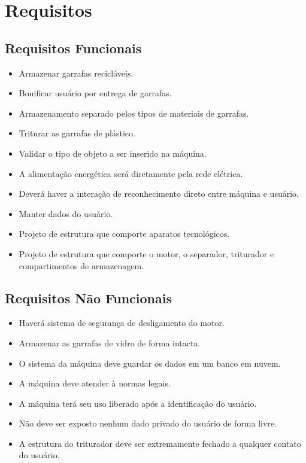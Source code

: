 \section{Requisitos}
\label{sec:requisitos}
\subsection{Requisitos Funcionais}

\begin{itemize}
\item Armazenar garrafas recicláveis.
\item Bonificar usuário por entrega de garrafas.
\item Armazenamento separado pelos tipos de materiais de garrafas.
\item Triturar as garrafas de plástico.
\item Validar o tipo de objeto a ser inserido na máquina.
\item A alimentação energética será diretamente pela rede elétrica.
\item Deverá haver a interação de reconhecimento direto entre máquina e usuário.
\item Manter dados do usuário.
\item Projeto de estrutura que comporte aparatos tecnológicos.
\item Projeto de estrutura que comporte o motor, o separador, triturador e compartimentos de armazenagem.

\end{itemize}

\subsection{Requisitos Não Funcionais}

\begin{itemize}
\item Haverá sistema de segurança de desligamento do motor.
\item Armazenar as garrafas de vidro de forma intacta.
\item O sistema da máquina deve guardar os dados em um banco em nuvem.
\item A máquina deve atender à normas legais.
\item A máquina terá seu uso liberado após a identificação do usuário.
\item Não deve ser exposto nenhum dado privado do usuário de forma livre.
\item A estrutura do triturador deve ser extremamente fechado a qualquer contato do usuário. 

\end{itemize}

